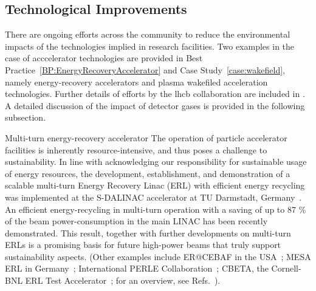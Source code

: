 \documentclass[../SustainableHEP.tex]{subfiles}
\begin{document}

\subsection{Technological Improvements}

There are ongoing efforts across the \ACR community to reduce the environmental impacts of the technologies implied in research facilities. Two examples in the case of acccelerator technologies are provided in Best Practice~\ref{BP:EnergyRecoveryAccelerator} and Case Study~\ref{case:wakefield}, namely energy-recovery accelerators and plasma wakefiled acceleration technologies. Further details of efforts by the \acrshort{lhcb} collaboration are included in . A detailed discussion of the impact of detector gases is provided in the following subsection.

\begin{bestpractice}{Multi-turn energy-recovery accelerator}%
\noindent The operation of particle accelerator facilities is inherently resource-intensive, and thus poses a challenge to sustainability. In line with acknowledging our responsibility for sustainable usage of energy resources, the development, establishment, and demonstration of a scalable multi-turn Energy Recovery Linac (ERL) with efficient energy recycling was implemented at the S-DALINAC accelerator at TU Darmstadt, Germany~\cite{Arnold:2020snn}. An efficient energy-recycling in multi-turn operation with a saving of up to 87 \% of the beam power-consumption in the main LINAC has been recently demonstrated. This result, together with further developments on multi-turn ERLs is a promising basis for future high-power beams that truly support sustainability aspects. (Other examples include ER@CEBAF in the USA~\cite{Meot:2018yoo}; MESA ERL in Germany~\cite{MESA}; International PERLE Collaboration~\cite{PERLE, PERLECDR}; CBETA, the Cornell-BNL ERL Test Accelerator~\cite{CBETACDR}; for an overview, see Refs.~\cite{Klein:2022lgx, Hutton:2022kac}).
\end{bestpractice}
\end{document}
